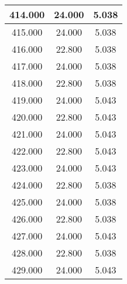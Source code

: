 \documentclass[11pt,a4paper]{jsarticle}
\begin{document}
\begin{center}
\begin{longtable}{|c|c|c|}
414.000	 & 24.000&  5.038 \\ \hline
415.000	 & 24.000&  5.038 \\ \hline
416.000	 & 22.800&  5.038 \\ \hline
417.000	 & 24.000&  5.038 \\ \hline
418.000	 & 22.800&  5.038 \\ \hline
419.000	 & 24.000&  5.043 \\ \hline
420.000	 & 22.800&  5.043 \\ \hline
421.000	 & 24.000&  5.043 \\ \hline
422.000	 & 22.800&  5.043 \\ \hline
423.000	 & 24.000&  5.043 \\ \hline
424.000	 & 22.800&  5.038 \\ \hline
425.000	 & 24.000&  5.038 \\ \hline
426.000	 & 22.800&  5.038 \\ \hline
427.000	 & 24.000&  5.043 \\ \hline
428.000	 & 22.800&  5.038 \\ \hline
429.000	 & 24.000&  5.043 \\ \hline
    \end{longtable}
  \end{center}
\end{document}
